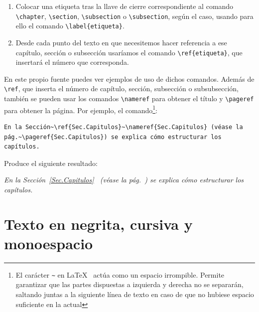 \begin{enumerate}
    \item Colocar una etiqueta tras la llave de cierre correspondiente al comando \verb|\chapter|, \verb|\section|, \verb|\subsection| o \verb|\subsection|, según el caso, usando para ello el comando \verb|\label{etiqueta}|.
    
    \item Desde cada punto del texto en que necesitemos hacer referencia a ese capítulo, sección o subsección usaríamos el comando \verb|\ref{etiqueta}|, que insertará el número que corresponda.
\end{enumerate}

En este propio fuente puedes ver ejemplos de uso de dichos comandos. Además de \verb|\ref|, que inserta el número de capítulo, sección, subsección o subsubsección, también se pueden usar los comandos \verb|\nameref| para obtener el título y \verb|\pageref| para obtener la página. Por ejemplo, el comando\footnote{El carácter \texttt{\~} en \LaTeX~ actúa como un espacio irrompible. Permite garantizar que las partes dispuestas a izquierda y derecha no se separarán, saltando juntas a la siguiente línea de texto en caso de que no hubiese espacio suficiente en la actual}:

\begin{verbatim}
En la Sección~\ref{Sec.Capitulos}~\nameref{Sec.Capitulos} (véase la 
pág.~\pageref{Sec.Capitulos}) se explica cómo estructurar los capítulos.
\end{verbatim}

Produce el siguiente resultado:

\textit{En la Sección~\ref{Sec.Capitulos}~ (véase la pág.~\pageref{Sec.Capitulos}) se explica cómo estructurar los capítulos.
}

\section{Texto en negrita, cursiva y monoespacio}

